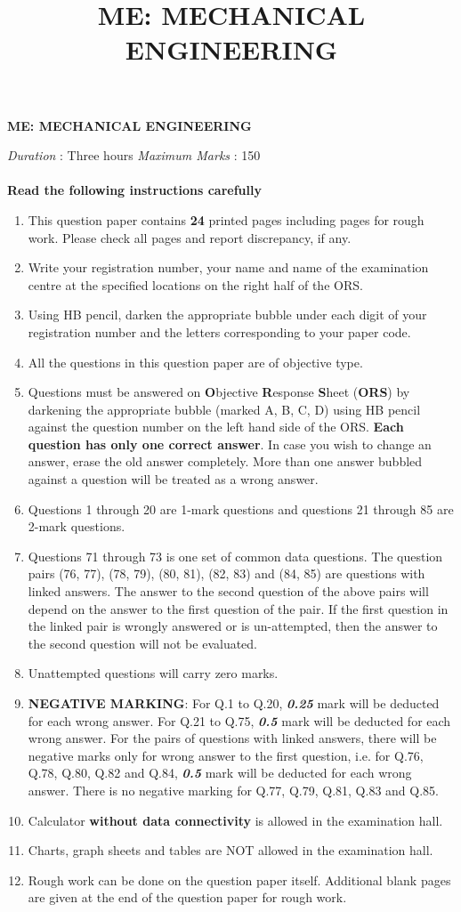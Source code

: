 \documentclass[journal,12pt,onecolumn]{IEEEtran}
\title{ME: MECHANICAL ENGINEERING}
\begin{document}
\begin{center}
    \Large
    \textbf{ME: MECHANICAL ENGINEERING}
\end{center}

\textit{Duration} : Three hours
\hfill
\textit{Maximum Marks} : 150
\\\\
\textbf{Read the following instructions carefully}
\begin{enumerate}
    \item This question paper contains \textbf{24} printed pages including pages for rough work. Please check all pages and report discrepancy, if any.
    \item Write your registration number, your name and name of the examination centre at the specified locations on the right half of the ORS.
    \item Using HB pencil, darken the appropriate bubble under each digit of your registration number and the letters corresponding to your paper code.
    \item All the questions in this question paper are of objective type.
    \item Questions must be answered on \textbf{O}bjective \textbf{R}esponse \textbf{S}heet (\textbf{ORS}) by darkening the appropriate bubble (marked A, B, C, D) using HB pencil against the question number on the left hand side of the ORS. \textbf{Each question has only one correct answer}. In case you wish to change an answer, erase the old answer completely. More than one answer bubbled against a question will be treated as a wrong answer.
    \item Questions 1 through 20 are 1-mark questions and questions 21 through 85 are 2-mark questions.
    \item Questions 71 through 73 is one set of common data questions. The question pairs (76, 77), (78, 79), (80, 81), (82, 83) and (84, 85) are questions with linked answers. The answer to the second question of the above pairs will depend on the answer to the first question of the pair. If the first question in the linked pair is wrongly answered or is un-attempted, then the answer to the second question will not be evaluated.
    \item Unattempted questions will carry zero marks.
    \item \textbf{NEGATIVE MARKING}: For Q.1 to Q.20, \textit{\textbf{0.25}} mark will be deducted for each wrong answer. For Q.21 to Q.75, \textit{\textbf{0.5}} mark will be deducted for each wrong answer. For the pairs of questions with linked answers, there will be negative marks only for wrong answer to the first question, i.e. for Q.76, Q.78, Q.80, Q.82 and Q.84, \textit{\textbf{0.5}} mark will be deducted for each wrong answer. There is no negative marking for Q.77, Q.79, Q.81, Q.83 and Q.85.
    \item Calculator \textbf{without data connectivity} is allowed in the examination hall.
    \item Charts, graph sheets and tables are NOT allowed in the examination hall.
    \item Rough work can be done on the question paper itself. Additional blank pages are given at the end of the question paper for rough work.
\end{enumerate}
\end{document}
